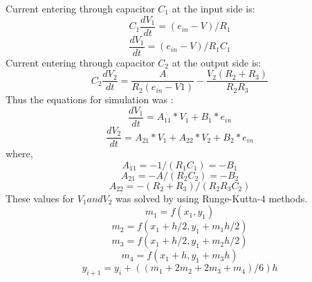 \documentclass[10pt,journal,cspaper,compsoc]{IEEEtran}
\begin{document}
  Current entering through capacitor \begin{math}
    C_1
  \end{math} at the input side is:
  \begin{equation}
    C_1 \frac{dV_1}{dt} = (e_{in} - V)/R_1
  \end{equation}
  \begin{equation*}
    \frac{dV_1}{dt} = (e_{in}-V)/R_1C_1
  \end{equation*}
  Current entering through capacitor \begin{math}
    C_2
  \end{math} at the output side is:
  \begin{equation}
    C_2 \frac{dV_2}{dt} = \frac{A}{R_2(e_{in}-V1)} - \frac{V_2(R_2+R_3)}{R_2 R_3}
  \end{equation}
  Thus the equations for simulation was :
  \begin{equation}
    \frac{dV_1}{dt} = A_{11} * V_1 + B_1 * e_{in}
  \end{equation}
  \begin{equation}
    \frac{dV_2}{dt} = A_{21} * V_1 + A_{22} * V_2 + B_2 * e_{in}
  \end{equation}
  where,
  \begin{equation*}
    A_{11} = -1/(R_1C_1) = -B_1
  \end{equation*}
  \begin{equation*}
    A_{21} = -A/(R_2C_2) = -B_2
  \end{equation*}
  \begin{equation*}
    A_{22} = - (R_2 + R_3)/(R_2R_3C_2)
  \end{equation*}
  These values for \begin{math}
    V_1 and V_2
  \end{math}
  was solved by using Runge-Kutta-4 methods.
  \begin{equation*}
      m_1 = f(x_1,y_1)
  \end{equation*}
  \begin{equation*}
    m_2 = f(x_1 + h/2, y_1 + m_1 h/2)
  \end{equation*}
  \begin{equation*}
    m_3 = f(x_1 + h/2, y_1 + m_2 h/2)
  \end{equation*}
  \begin{equation*}
    m_4 = f(x_1 +h, y_1 + m_3 h)
  \end{equation*}
  \begin{equation*}
    y_{i+1} = y_i + ( (m_1 + 2m_2 + 2m_3 + m_4)/6)h
  \end{equation*}
\end{document}
